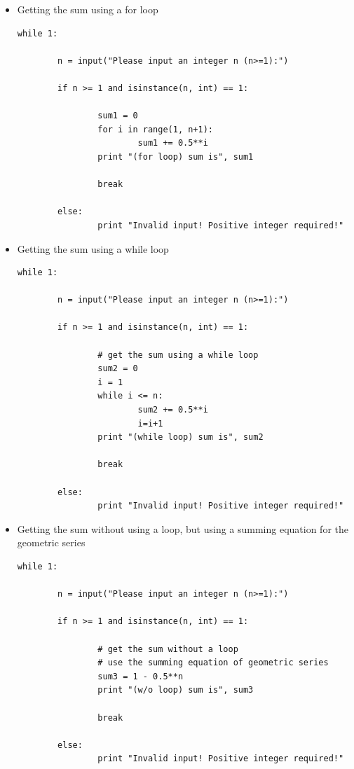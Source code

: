 \begin{itemize}

\item Getting the sum using a for loop
\begin{verbatim}
while 1:

        n = input("Please input an integer n (n>=1):")

        if n >= 1 and isinstance(n, int) == 1:
                
                sum1 = 0
                for i in range(1, n+1):
                        sum1 += 0.5**i
                print "(for loop) sum is", sum1

                break

        else:
                print "Invalid input! Positive integer required!"
\end{verbatim}


\item Getting the sum using a while loop 
\begin{verbatim}
while 1:

        n = input("Please input an integer n (n>=1):")

        if n >= 1 and isinstance(n, int) == 1:

                # get the sum using a while loop
                sum2 = 0
                i = 1
                while i <= n:
                        sum2 += 0.5**i
                        i=i+1
                print "(while loop) sum is", sum2

                break

        else:
                print "Invalid input! Positive integer required!"
\end{verbatim}



\item Getting the sum without using a loop, but using a summing equation for the geometric series 
\begin{verbatim}
while 1:

        n = input("Please input an integer n (n>=1):")

        if n >= 1 and isinstance(n, int) == 1:

                # get the sum without a loop
                # use the summing equation of geometric series
                sum3 = 1 - 0.5**n
                print "(w/o loop) sum is", sum3

                break

        else:
                print "Invalid input! Positive integer required!"
\end{verbatim}

\end{itemize}

